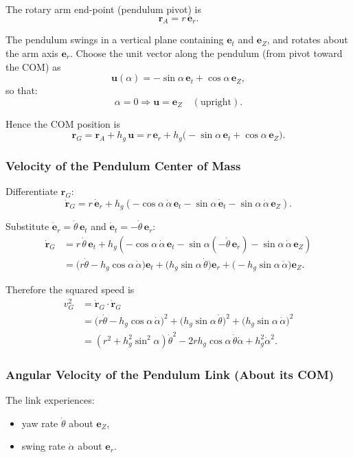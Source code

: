 \documentclass[12pt,a4paper]{article}
\begin{document}
The rotary arm end-point (pendulum pivot) is
\[
\bm r_A = r\,\bm e_r.
\]

The pendulum swings in a vertical plane containing $\bm e_t$ and $\bm e_Z$, and rotates about the arm axis $\bm e_r$.
Choose the unit vector along the pendulum (from pivot toward the COM) as
\[
\bm u(\alpha)= -\sin\alpha\,\bm e_t+\cos\alpha\,\bm e_Z,
\]
so that:
\[
\alpha=0 \Rightarrow \bm u=\bm e_Z \quad (\text{upright}).
\]

Hence the COM position is
\[
\bm r_G
=
\bm r_A+h_g\,\bm u
=
r\,\bm e_r+h_g\big(-\sin\alpha\,\bm e_t+\cos\alpha\,\bm e_Z\big).
\]

\subsubsection{Velocity of the Pendulum Center of Mass}

Differentiate $\bm r_G$:
\[
\dot{\bm r}_G
=
r\,\dot{\bm e}_r
+h_g\left(-\cos\alpha\,\dot\alpha\,\bm e_t-\sin\alpha\,\dot{\bm e}_t-\sin\alpha\,\dot\alpha\,\bm e_Z\right).
\]

Substitute $\dot{\bm e}_r=\dot\theta\,\bm e_t$ and $\dot{\bm e}_t=-\dot\theta\,\bm e_r$:
\begin{align*}
\dot{\bm r}_G
&=
r\,\dot\theta\,\bm e_t
+h_g\left(-\cos\alpha\,\dot\alpha\,\bm e_t-\sin\alpha(-\dot\theta\,\bm e_r)-\sin\alpha\,\dot\alpha\,\bm e_Z\right)\\[4pt]
&=
\big(r\dot\theta-h_g\cos\alpha\,\dot\alpha\big)\bm e_t
+\big(h_g\sin\alpha\,\dot\theta\big)\bm e_r
+\big(-h_g\sin\alpha\,\dot\alpha\big)\bm e_Z.
\end{align*}

Therefore the squared speed is
\begin{align*}
v_G^2
&=\dot{\bm r}_G\cdot\dot{\bm r}_G\\
&=\big(r\dot\theta-h_g\cos\alpha\,\dot\alpha\big)^2
+\big(h_g\sin\alpha\,\dot\theta\big)^2
+\big(h_g\sin\alpha\,\dot\alpha\big)^2\\[4pt]
&=
\left(r^2+h_g^2\sin^2\alpha\right)\dot\theta^2
-2r h_g\cos\alpha\,\dot\theta\dot\alpha
+h_g^2\dot\alpha^2.
\end{align*}

\subsubsection{Angular Velocity of the Pendulum Link (About its COM)}

The link experiences:
\begin{itemize}
  \item yaw rate $\dot\theta$ about $\bm e_Z$,
  \item swing rate $\dot\alpha$ about $\bm e_r$.
\end{itemize}
\end{document}
